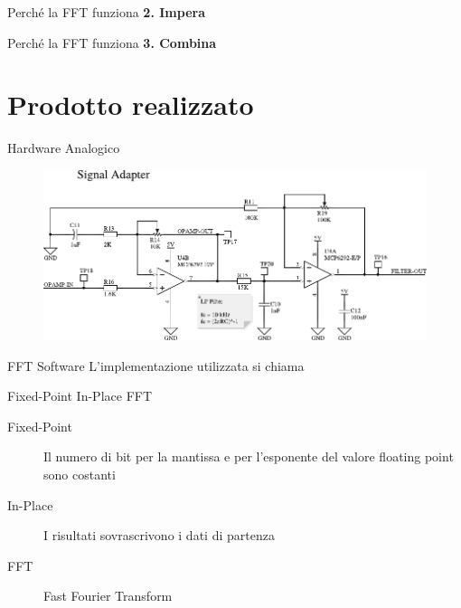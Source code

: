 \documentclass[10pt, xetex, handout]{beamer}
\begin{document}
\begin{frame}{Perch\'e la FFT funziona}
    \textbf{\LARGE 2. Impera}
\end{frame}

\begin{frame}{Perch\'e la FFT funziona}
    \textbf{\LARGE 3. Combina}
\end{frame}

\section{Prodotto realizzato}
\begin{frame}{Hardware Analogico}
    \begin{figure}
        \includegraphics[width=\linewidth]{figures/circuits/filter-ampl-v2}
    \end{figure}
\end{frame}

\begin{frame}{FFT Software}
    L'implementazione utilizzata si chiama
    \vfill
    \begin{center}
        \Large Fixed-Point In-Place FFT
    \end{center}
    \vfill
    \begin{description}
        \item [Fixed-Point] Il numero di bit per la mantissa e per
            l'esponente del valore floating point sono costanti
        \item [In-Place] I risultati sovrascrivono i dati di partenza
        \item [FFT] Fast Fourier Transform
    \end{description}
\end{frame}
\end{document}

